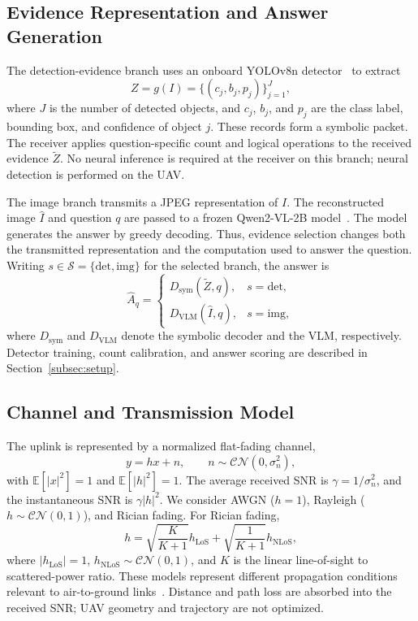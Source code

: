 \subsection{Evidence Representation and Answer Generation}
\label{subsec:levels}\label{subsec:answering}
The detection-evidence branch uses an onboard
YOLOv8n detector~\cite{jocher2023yolov8} to extract
\begin{equation}
Z=g(I)=\{(c_j,b_j,p_j)\}_{j=1}^{J},
\end{equation}
where $J$ is the number of detected objects, and $c_j$, $b_j$, and
$p_j$ are the class label, bounding box, and confidence of object $j$.
These records form a symbolic packet. The receiver applies
question-specific count and logical operations to the received
evidence $\tilde Z$. No neural inference is required at the receiver
on this branch; neural detection is performed on the UAV.

The image branch transmits a JPEG representation of $I$. The
reconstructed image $\hat I$ and question $q$ are passed to a frozen
Qwen2-VL-2B model~\cite{wang2024qwen2vl}. The model generates the
answer by greedy decoding. Thus, evidence selection changes both the
transmitted representation and the computation used to answer the
question. Writing $s\in\mathcal{S}=\{\mathrm{det},\mathrm{img}\}$ for
the selected branch, the answer is
\begin{equation}\label{eq:answer}
\hat A_q=
\begin{cases}
D_{\mathrm{sym}}(\tilde Z,q), & s=\mathrm{det},\\[2pt]
D_{\mathrm{VLM}}(\hat I,q), & s=\mathrm{img},
\end{cases}
\end{equation}
where $D_{\mathrm{sym}}$ and $D_{\mathrm{VLM}}$ denote the symbolic
decoder and the VLM, respectively. Detector training, count
calibration, and answer scoring are described in
Section~\ref{subsec:setup}.

\subsection{Channel and Transmission Model}\label{subsec:phy}
\label{subsec:channels}
The uplink is represented by a normalized flat-fading channel,
\begin{equation}\label{eq:link}
y=hx+n,\qquad n\sim\mathcal{CN}(0,\sigma_n^2),
\end{equation}
with $\mathbb{E}[|x|^2]=1$ and $\mathbb{E}[|h|^2]=1$.
The average received SNR is $\gamma=1/\sigma_n^2$, and the
instantaneous SNR is $\gamma|h|^2$. We consider AWGN ($h=1$),
Rayleigh ($h\sim\mathcal{CN}(0,1)$), and Rician fading. For Rician
fading,
\begin{equation}
h=\sqrt{\frac{K}{K+1}}h_{\mathrm{LoS}}
 +\sqrt{\frac{1}{K+1}}h_{\mathrm{NLoS}},
\end{equation}
where $|h_{\mathrm{LoS}}|=1$,
$h_{\mathrm{NLoS}}\sim\mathcal{CN}(0,1)$, and $K$ is the linear
line-of-sight to scattered-power ratio. These models represent
different propagation conditions relevant to air-to-ground
links~\cite{khawaja2019survey}. Distance and path loss are absorbed
into the received SNR; UAV geometry and trajectory are not optimized.

